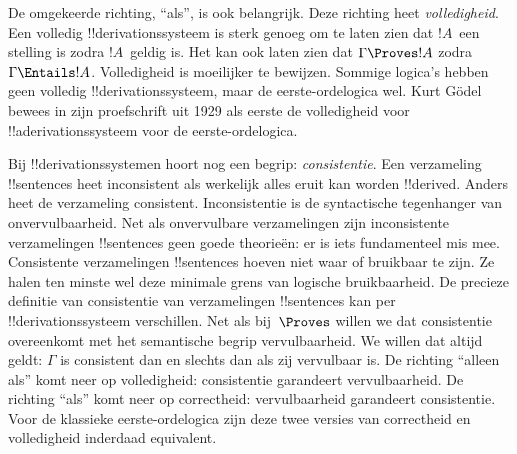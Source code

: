 \documentclass[openany]{memoir}
\begin{document}
De omgekeerde richting, ``als'', is ook belangrijk. Deze richting heet
\emph{volledigheid}. Een volledig !!{derivation}ssysteem is sterk
genoeg om te laten zien dat $!A$~een stelling is zodra $!A$~geldig is.
Het kan ook laten zien dat $\Gamma \Proves !A$ zodra
$\Gamma \Entails !A$. Volledigheid is moeilijker te bewijzen. Sommige
logica's hebben geen volledig !!{derivation}ssysteem, maar de
eerste-ordelogica wel. Kurt G\"odel bewees in zijn proefschrift uit
1929 als eerste de volledigheid voor !!a{derivation}ssysteem voor de
eerste-ordelogica.

Bij !!{derivation}ssystemen hoort nog een begrip:
\emph{consistentie}. Een verzameling !!{sentence}s heet inconsistent
als werkelijk alles eruit kan worden !!{derive}d. Anders heet de
verzameling consistent. Inconsistentie is de syntactische tegenhanger
van onvervulbaarheid. Net als onvervulbare verzamelingen zijn
inconsistente verzamelingen !!{sentence}s geen goede theorieën: er is
iets fundamenteel mis mee. Consistente verzamelingen !!{sentence}s
hoeven niet waar of bruikbaar te zijn. Ze halen ten minste wel deze
minimale grens van logische bruikbaarheid. De precieze definitie van
consistentie van verzamelingen !!{sentence}s kan per
!!{derivation}ssysteem verschillen. Net als bij~$\Proves$ willen we
dat consistentie overeenkomt met het semantische begrip
vervulbaarheid. We willen dat altijd geldt: $\Gamma$ is consistent
dan en slechts dan als zij vervulbaar is. De richting ``alleen als''
komt neer op volledigheid: consistentie garandeert vervulbaarheid. De
richting ``als'' komt neer op correctheid: vervulbaarheid garandeert
consistentie. Voor de klassieke eerste-ordelogica zijn deze twee
versies van correctheid en volledigheid inderdaad equivalent.
\endgroup

\begingroup
\def\olfilename{OLP-0065}
\def\olfilepath{content/first-order-logic/proof-systems/}
\hypertarget{unit-OLP-0065}{}



      {}
      {}
\end{document}

